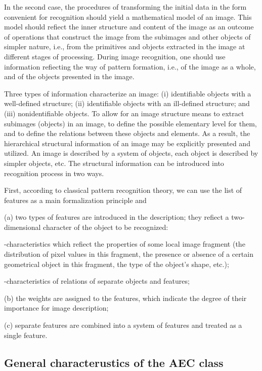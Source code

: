In the second case, the procedures of transforming the initial data in the form 
convenient for recognition should yield a mathematical model of an image. 
This model should refiect the inner structure and content of the image as an 
outcome of operations that construct the image from the subimages and other 
objects of simpler nature, i.e., from the primitives and objects extracted in the 
image at different stages of processing. During image recognition, one should use 
information refiecting the way of pattern formation, i.e., of the image as a whole, 
and of the objects presented in the image.  

Three types of information characterize an image: (i) identifiable objects with a 
well-defined structure; (ii) identifiable objects with an ill-defined structure; 
and (iii) nonidentifiable objects. To allow for an image structure means to extract 
subimages (objects) in an image, to define the possible elementary level for them, 
and to define the relations between these objects and elements. As a result, 
the hierarchical structural information of an image may be explicitly presented and 
utilized. An image is described by a system of objects, each object is described by 
simpler objects, etc. The structural information can be introduced into recognition 
process in two ways. 

First, according to classical pattern recognition theory, 
we can use the list of features as a main formalization principle and 

(a) two 
types of features are introduced in the description; they refiect a two-dimensional 
character of the object to be recognized: 

-characteristics which refiect the properties of some local image fragment 
(the distribution of pixel values in this fragment, the presence or 
absence of a certain geometrical object in this fragment, the type of 
the object's shape, etc.); 

-characteristics of relations of separate objects and features; 

(b) the weights are assigned to the features, which indicate the degree 
of their importance for image description; 

(c) separate features are combined into a system of features and treated 
as a single feature. 

\subsection{General characterustics of the AEC class}

